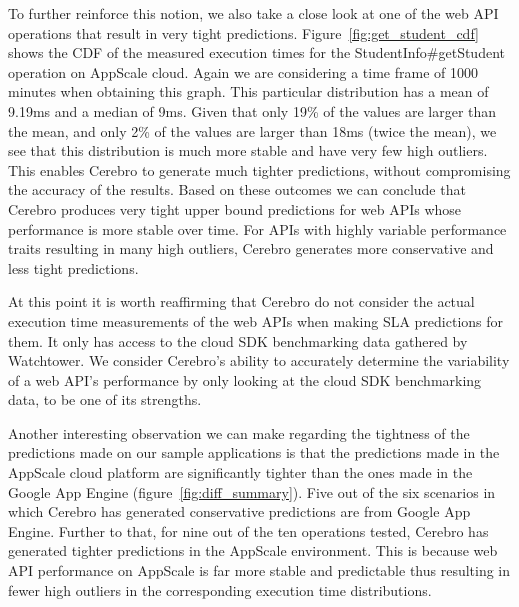 To further reinforce this notion, we also take a close look at one of the web API operations that result in very tight predictions. 
Figure~\ref{fig:get_student_cdf} shows the CDF of the measured execution times for the StudentInfo\#getStudent operation on
AppScale cloud. Again we are considering a time frame of 1000 minutes when obtaining this graph.
This particular distribution has a mean of 9.19ms and a median of 9ms. Given that only 19\% of the values are larger than the mean, 
and only 2\% of the values are larger than 18ms (twice the mean), 
we see that this distribution is much more stable and have very few high outliers. This enables Cerebro to generate much
tighter predictions, without compromising the accuracy of the results. Based on these outcomes we can conclude that Cerebro produces
very tight upper bound predictions for web APIs whose performance is more stable over time. For APIs with highly variable performance
traits resulting in many high outliers, Cerebro generates more conservative and less tight predictions.

At this point it is worth reaffirming that Cerebro do not consider the actual execution time measurements of the web APIs when
making SLA predictions for them. It only has access to the cloud SDK benchmarking data gathered by Watchtower. We consider
Cerebro's ability to accurately determine the variability of a web API's performance by only looking at the cloud SDK
benchmarking data, to be one of its strengths.

Another interesting observation we can make regarding the tightness of the predictions made on our sample applications is that 
the predictions made in the AppScale cloud platform are significantly tighter than the ones made in the Google App Engine (figure~\ref{fig:diff_summary}). 
Five out of the six scenarios in which Cerebro has generated conservative predictions are from Google App Engine. Further
to that, for nine out of the ten operations tested, Cerebro has generated tighter predictions in the AppScale environment. This is 
because web API performance on AppScale is far more stable and predictable thus resulting in fewer high outliers in the corresponding
execution time distributions.

